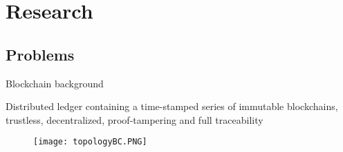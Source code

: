 

\section{Research}

\subsection{Problems}

\begin{frame}{Blockchain background}
\begin{multicols}{2}
  \alert{Distributed ledger containing a time-stamped series of immutable blockchains, trustless, decentralized, proof-tampering and full traceability}
    \begin{figure}[h]
        \centering
        \texttt{[image: topologyBC.PNG]}
    \end{figure}
\end{multicols}
\end{frame}


